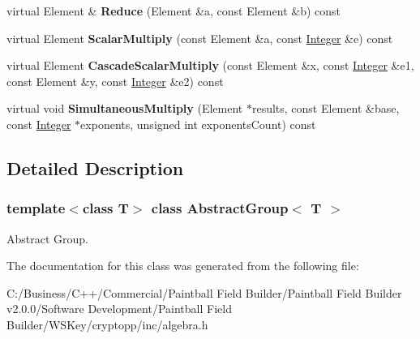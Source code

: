 \begin{DoxyCompactItemize}
\item 
\hypertarget{class_abstract_group_a33ab0d605c764d443b5bed2ea5495ea8}{
virtual Element \& {\bfseries Reduce} (Element \&a, const Element \&b) const }
\label{class_abstract_group_a33ab0d605c764d443b5bed2ea5495ea8}

\item 
\hypertarget{class_abstract_group_af744ac568eb42500a914125b1addb5f5}{
virtual Element {\bfseries ScalarMultiply} (const Element \&a, const \hyperlink{class_integer}{Integer} \&e) const }
\label{class_abstract_group_af744ac568eb42500a914125b1addb5f5}

\item 
\hypertarget{class_abstract_group_a33d7face914b65e380246a18882f230c}{
virtual Element {\bfseries CascadeScalarMultiply} (const Element \&x, const \hyperlink{class_integer}{Integer} \&e1, const Element \&y, const \hyperlink{class_integer}{Integer} \&e2) const }
\label{class_abstract_group_a33d7face914b65e380246a18882f230c}

\item 
\hypertarget{class_abstract_group_a5813633097333ef81e9b652f66718001}{
virtual void {\bfseries SimultaneousMultiply} (Element $\ast$results, const Element \&base, const \hyperlink{class_integer}{Integer} $\ast$exponents, unsigned int exponentsCount) const }
\label{class_abstract_group_a5813633097333ef81e9b652f66718001}

\end{DoxyCompactItemize}


\subsection{Detailed Description}
\subsubsection*{template$<$class T$>$ class AbstractGroup$<$ T $>$}

Abstract Group. 

The documentation for this class was generated from the following file:\begin{DoxyCompactItemize}
\item 
C:/Business/C++/Commercial/Paintball Field Builder/Paintball Field Builder v2.0.0/Software Development/Paintball Field Builder/WSKey/cryptopp/inc/algebra.h\end{DoxyCompactItemize}
